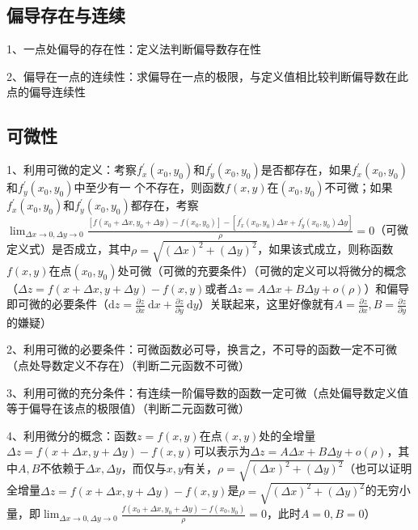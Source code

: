 \subsection{偏导存在与连续}

1、一点处偏导的存在性：定义法判断偏导数存在性

2、偏导在一点的连续性：求偏导在一点的极限，与定义值相比较判断偏导数在此点的偏导连续性



\subsection{可微性}

1、利用可微的定义：考察$f_{x}^{\prime}\left(x_{0}, y_{0}\right)和f_{y}^{\prime}\left(x_{0}, y_{0}\right)$是否都存在，如果$f_{x}^{\prime}\left(x_{0}, y_{0}\right)$和$f_{y}^{\prime}\left(x_{0}, y_{0}\right)$中至少有一 个不存在，则函数$f(x, y)$在$\left(x_{0}, y_{0}\right)$不可微；如果$f_{x}^{\prime}\left(x_{0}, y_{0}\right)$和$f_{y}^{\prime}\left(x_{0}, y_{0}\right)$都存在，考察$\lim_{\Delta x \rightarrow 0,\Delta y \rightarrow 0}\frac{\left[f\left(x_{0}+\Delta x, y_{0}+\Delta y\right)-f\left(x_{0}, y_{0}\right)\right]-\left[f_{x}^{\prime}\left(x_{0}, y_{0}\right) \Delta x+f_{y}^{\prime}\left(x_{0}, y_{0}\right) \Delta y\right]}{\rho}=0$（可微定义式）是否成立，其中$\rho=\sqrt{(\Delta x)^{2}+(\Delta y)^{2}}$，如果该式成立，则称函数$f(x, y)$在点$(x_0, y_0)$处可微（可微的充要条件）（可微的定义可以将微分的概念（$\Delta z=f(x+\Delta x, y+\Delta y)-f(x, y)$或者$\Delta z=A \Delta x+B \Delta y+o(\rho)$）和偏导即可微的必要条件（$\mathrm{d} z=\frac{\partial z}{\partial x} \mathrm{~d} x+\frac{\partial z}{\partial y} \mathrm{~d} y$）关联起来，这里好像就有$A=\frac{\partial z}{\partial x},B=\frac{\partial z}{\partial y}$的嫌疑）

2、利用可微的必要条件：可微函数必可导，换言之，不可导的函数一定不可微（点处导数定义不存在）（判断二元函数不可微）

3、利用可微的充分条件：有连续一阶偏导数的函数一定可微（点处偏导数定义值等于偏导在该点的极限值）（判断二元函数可微）

4、利用微分的概念：函数$z=f(x, y)$在点$(x, y)$处的全增量$\Delta z=f(x+\Delta x, y+\Delta y)-f(x, y)$可以表示为$\Delta z=A \Delta x+B \Delta y+o(\rho)$，其中$A,B$不依赖于$\Delta x, \Delta y$，而仅与$x, y$有关，$\rho=\sqrt{(\Delta x)^{2}+(\Delta y)^{2}}$（也可以证明全增量$\Delta z=f(x+\Delta x, y+\Delta y)-f(x, y)$是$\rho=\sqrt{(\Delta x)^{2}+(\Delta y)^{2}}$的无穷小量，即$\lim_{\Delta x \rightarrow 0,\Delta y \rightarrow 0}\frac{f\left(x_{0}+\Delta x, y_{0}+\Delta y\right)-f\left(x_{0}, y_{0}\right)}{\rho}=0$，此时$A=0,B=0$）



